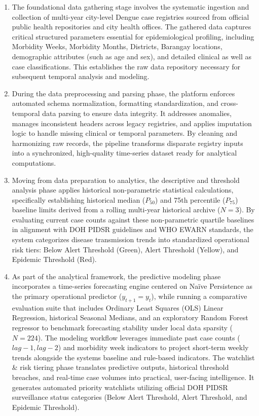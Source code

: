 \documentclass[
]{article}
\begin{document}
\begin{enumerate}
\def\labelenumi{\arabic{enumi}.}
\item
  The foundational data gathering stage involves the systematic
  ingestion and collection of multi-year city-level Dengue case
  registries sourced from official public health repositories and city
  health offices. The gathered data captures critical structured
  parameters essential for epidemiological profiling, including
  Morbidity Weeks, Morbidity Months, Districts, Barangay locations,
  demographic attributes (such as age and sex), and detailed clinical as
  well as case classifications. This establishes the raw data repository
  necessary for subsequent temporal analysis and modeling.
\item
  During the data preprocessing and parsing phase, the platform enforces
  automated schema normalization, formatting standardization, and
  cross-temporal data parsing to ensure data integrity. It addresses
  anomalies, manages inconsistent headers across legacy registries, and
  applies imputation logic to handle missing clinical or temporal
  parameters. By cleaning and harmonizing raw records, the pipeline
  transforms disparate registry inputs into a synchronized, high-quality
  time-series dataset ready for analytical computations.
\item
  Moving from data preparation to analytics, the descriptive and
  threshold analysis phase applies historical non-parametric statistical
  calculations, specifically establishing historical median (\(P_{50}\))
  and 75th percentile (\(P_{75}\)) baseline limits derived from a
  rolling multi-year historical archive (\(N = 3\)). By evaluating
  current case counts against these non-parametric quartile baselines in
  alignment with DOH PIDSR guidelines and WHO EWARN standards, the
  system categorizes disease transmission trends into standardized
  operational risk tiers: Below Alert Threshold (Green), Alert Threshold
  (Yellow), and Epidemic Threshold (Red).
\item
  As part of the analytical framework, the predictive modeling phase
  incorporates a time-series forecasting engine centered on Naïve
  Persistence as the primary operational predictor
  (\(y_{t + 1} = y_{t}\)), while running a comparative evaluation suite
  that includes Ordinary Least Squares (OLS) Linear Regression,
  historical Seasonal Medians, and an exploratory Random Forest
  regressor to benchmark forecasting stability under local data sparsity
  (\(N = 224\)). The modeling workflow leverages immediate past case
  counts (\(lag - 1,lag - 2\)) and morbidity week indicators to project
  short-term weekly trends alongside the system\textquotesingle s
  baseline and rule-based indicators. The watchlist \& risk tiering
  phase translates predictive outputs, historical threshold breaches,
  and real-time case volumes into practical, user-facing intelligence.
  It generates automated priority watchlists utilizing official DOH
  PIDSR surveillance status categories (Below Alert Threshold, Alert
  Threshold, and Epidemic Threshold).
\end{enumerate}
\end{document}
